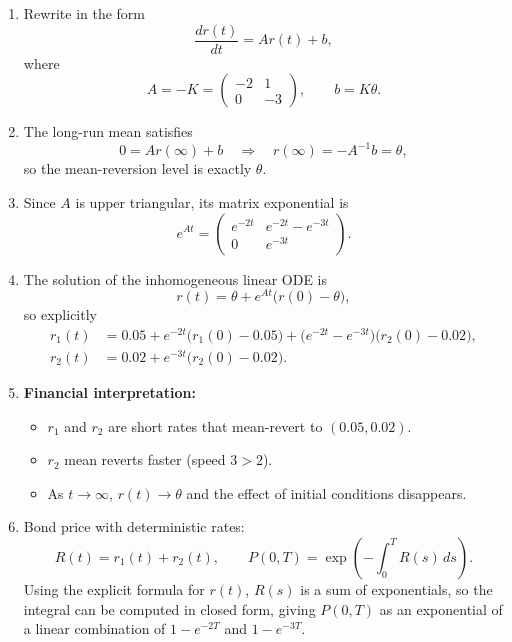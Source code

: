 \documentclass[11pt]{article}
\begin{document}
\begin{enumerate}

\item Rewrite in the form
\[
\frac{dr(t)}{dt}=Ar(t)+b,
\]
where
\[
A=-K=
\begin{pmatrix}
-2 & 1\\
0 & -3
\end{pmatrix},
\qquad
b=K\theta.
\]

\item The long-run mean satisfies
\[
0=Ar(\infty)+b
\quad\Rightarrow\quad
r(\infty)=-A^{-1}b=\theta,
\]
so the mean-reversion level is exactly $\theta$.

\item Since $A$ is upper triangular, its matrix exponential is
\[
e^{At}=
\begin{pmatrix}
e^{-2t} & e^{-2t}-e^{-3t}\\
0 & e^{-3t}
\end{pmatrix}.
\]

\item The solution of the inhomogeneous linear ODE is
\[
r(t)=\theta+e^{At}\bigl(r(0)-\theta\bigr),
\]
so explicitly
\[
\begin{aligned}
r_1(t)
&=0.05
+e^{-2t}\bigl(r_1(0)-0.05\bigr)
+\bigl(e^{-2t}-e^{-3t}\bigr)\bigl(r_2(0)-0.02\bigr),
\\[4pt]
r_2(t)
&=0.02
+e^{-3t}\bigl(r_2(0)-0.02\bigr).
\end{aligned}
\]

\item
\textbf{Financial interpretation:}
\begin{itemize}
\item $r_1$ and $r_2$ are short rates that mean-revert to $(0.05,0.02)$.
\item $r_2$ mean reverts faster (speed $3>2$).
\item As $t\to\infty$, $r(t)\to\theta$ and the effect of initial conditions disappears.
\end{itemize}

\item Bond price with deterministic rates:
\[
R(t)=r_1(t)+r_2(t),
\qquad
P(0,T)=\exp\!\left(-\int_0^T R(s)\,ds\right).
\]
Using the explicit formula for $r(t)$, $R(s)$ is a sum of exponentials, so the integral can be computed in closed form, giving $P(0,T)$ as an exponential of a linear combination of $1-e^{-2T}$ and $1-e^{-3T}$.
\end{enumerate}

\bigskip
\end{document}
